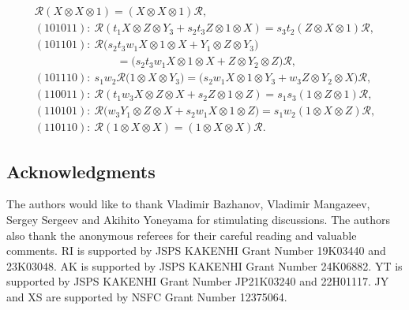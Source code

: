 \documentclass[pdftex]{sigma}
\numberwithin{equation}{section}
\begin{document}
\begin{gather}
 \mathscr{R}(X \otimes X \otimes 1) = (X \otimes X \otimes 1)\mathscr{R},
\label{d12}\\
(101011)\colon\
 \mathscr{R} (t_1X \otimes Z \otimes Y_3 + s_2 t_3 Z \otimes 1 \otimes X)
= s_3 t_2 (Z \otimes X \otimes 1)\mathscr{R},
\label{d13}\\
(101101)\colon\ \mathscr{R}\bigl(
s_2t_3w_1 X \otimes 1 \otimes X
+ Y_1 \otimes Z \otimes Y_3\bigr)\nonumber\\
\phantom{(101101)\colon\ }{}\qquad
=\bigl(s_2 t_3w_1X \otimes 1 \otimes X
+ Z \otimes Y_2 \otimes Z\bigr)\mathscr{R},
\label{d14}\\
(101110)\colon\ s_1w_2 \mathscr{R}\bigl(1 \otimes X \otimes Y_3)
=
\bigl(s_2w_1X \otimes 1 \otimes Y_3
+ w_3 Z \otimes Y_2 \otimes X\bigr)\mathscr{R},
\label{d15}\\
(110011)\colon\
 \mathscr{R}(t_1w_3 X \otimes Z \otimes X + s_2 Z \otimes 1 \otimes Z) = s_1s_3 (1 \otimes Z \otimes 1)\mathscr{R},
\label{d16}\\
(110101)\colon\
 \mathscr{R}\bigl (w_3 Y_1 \otimes Z \otimes X + s_2 w_1 X \otimes 1 \otimes Z\bigr)
= s_1 w_2 (1 \otimes X \otimes Z)\mathscr{R},
\label{d17}\\
(110110)\colon\
 \mathscr{R}(1\otimes X\otimes X) = (1\otimes X \otimes X)\mathscr{R}.
\label{d18}
\end{gather}

\subsection*{Acknowledgments}

The authors would like to thank Vladimir Bazhanov, Vladimir Mangazeev,
Sergey Sergeev and Akihito Yoneyama for stimulating discussions. The
authors also thank the anonymous referees for their careful reading
and valuable comments. RI is supported by JSPS KAKENHI Grant Number
19K03440 and 23K03048. AK is supported by JSPS KAKENHI Grant Number 24K06882.
YT is supported by JSPS KAKENHI Grant Number
JP21K03240 and 22H01117. JY and XS are supported by NSFC Grant Number
12375064.
\end{document}
